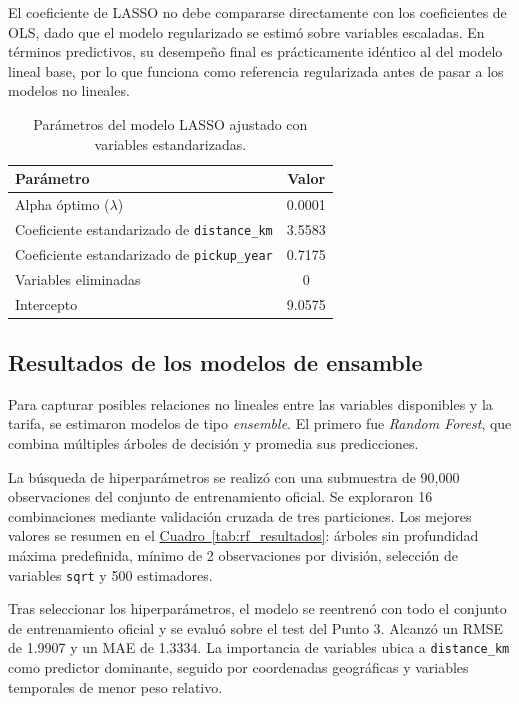 \documentclass[10pt]{article}
\newcommand{\cuadroref}[1]{\hyperref[#1]{Cuadro~\ref*{#1}}}
\begin{document}
	El coeficiente de LASSO no debe compararse directamente con los coeficientes de OLS, dado que el modelo regularizado se estimó sobre variables escaladas. En términos predictivos, su desempeño final es prácticamente idéntico al del modelo lineal base, por lo que funciona como referencia regularizada antes de pasar a los modelos no lineales.

	\begin{table}[!htbp]
		\centering
		\caption{Parámetros del modelo LASSO ajustado con variables estandarizadas.}
		\label{tab:lasso_resultados}
		\begin{tabular}{lc}
			\hline
			\textbf{Parámetro} & \textbf{Valor} \\
			\hline
			Alpha óptimo ($\lambda$) & 0.0001 \\
			Coeficiente estandarizado de \texttt{distance\_km} & 3.5583 \\
			Coeficiente estandarizado de \texttt{pickup\_year} & 0.7175 \\
			Variables eliminadas & 0 \\
			Intercepto & 9.0575 \\
			\hline
		\end{tabular}
	\end{table}


	\subsection{Resultados de los modelos de ensamble}

	Para capturar posibles relaciones no lineales entre las variables disponibles y la tarifa, se estimaron modelos de tipo \textit{ensemble}. El primero fue \textit{Random Forest}, que combina múltiples árboles de decisión y promedia sus predicciones.

	La búsqueda de hiperparámetros se realizó con una submuestra de 90{,}000 observaciones del conjunto de entrenamiento oficial. Se exploraron 16 combinaciones mediante validación cruzada de tres particiones. Los mejores valores se resumen en el \cuadroref{tab:rf_resultados}: árboles sin profundidad máxima predefinida, mínimo de 2 observaciones por división, selección de variables \texttt{sqrt} y 500 estimadores.

	Tras seleccionar los hiperparámetros, el modelo se reentrenó con todo el conjunto de entrenamiento oficial y se evaluó sobre el test del Punto 3. Alcanzó un RMSE de 1.9907 y un MAE de 1.3334. La importancia de variables ubica a \texttt{distance\_km} como predictor dominante, seguido por coordenadas geográficas y variables temporales de menor peso relativo.
\end{document}
